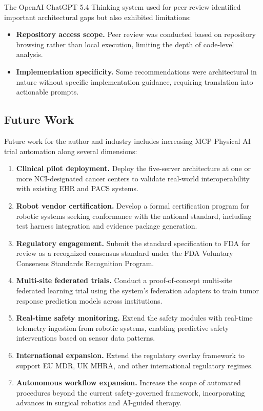 \documentclass{article}
\begin{document}
The OpenAI ChatGPT 5.4 Thinking system used for peer review identified important architectural gaps but also exhibited limitations:

\begin{itemize}[leftmargin=*]
\item \textbf{Repository access scope.} Peer review was conducted based on repository browsing rather than local execution, limiting the depth of code-level analysis.
\item \textbf{Implementation specificity.} Some recommendations were architectural in nature without specific implementation guidance, requiring translation into actionable prompts.
\end{itemize}

\subsection{Future Work}

Future work for the author and industry includes increasing MCP Physical AI trial automation along several dimensions:

\begin{enumerate}[leftmargin=*]
\item \textbf{Clinical pilot deployment.} Deploy the five-server architecture at one or more NCI-designated cancer centers to validate real-world interoperability with existing EHR and PACS systems.

\item \textbf{Robot vendor certification.} Develop a formal certification program for robotic systems seeking conformance with the national standard, including test harness integration and evidence package generation.

\item \textbf{Regulatory engagement.} Submit the standard specification to FDA for review as a recognized consensus standard under the FDA Voluntary Consensus Standards Recognition Program.

\item \textbf{Multi-site federated trials.} Conduct a proof-of-concept multi-site federated learning trial using the system's federation adapters to train tumor response prediction models across institutions.

\item \textbf{Real-time safety monitoring.} Extend the safety modules with real-time telemetry ingestion from robotic systems, enabling predictive safety interventions based on sensor data patterns.

\item \textbf{International expansion.} Extend the regulatory overlay framework to support EU MDR, UK MHRA, and other international regulatory regimes.

\item \textbf{Autonomous workflow expansion.} Increase the scope of automated procedures beyond the current safety-governed framework, incorporating advances in surgical robotics and AI-guided therapy.
\end{enumerate}
\end{document}
